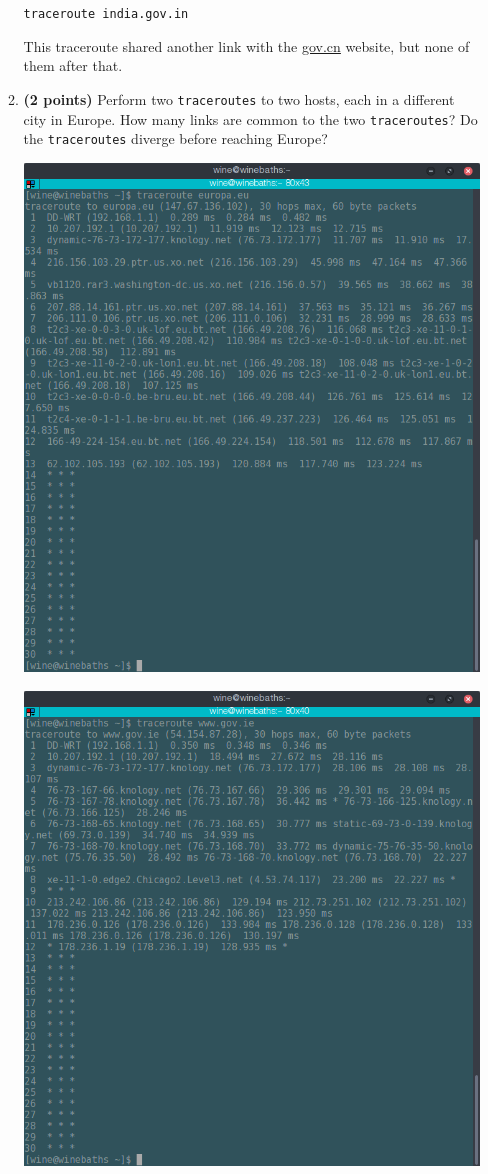 \documentclass{article}
\begin{document}
\begin{enumerate}
\begin{enumerate}
\texttt{traceroute india.gov.in}

This traceroute shared another link with the \url{gov.cn} website, but none of them after that.

\item \textbf{(2 points)} Perform two \texttt{traceroutes} to two hosts, each in a different city in Europe. How many links are common to the two \texttt{traceroutes}? Do the \texttt{traceroutes} diverge before reaching Europe?

\includegraphics[scale=0.5]{eu1.png}

\includegraphics[scale=0.5]{ie1.png}


\end{enumerate}
\end{enumerate}
\end{document}
